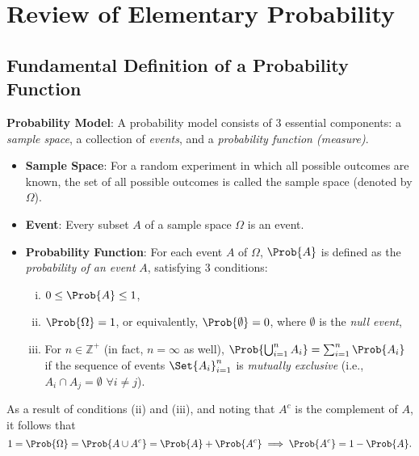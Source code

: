 \chapter{Review of Elementary Probability}
\section*{Fundamental Definition of a Probability Function}
\begin{Regular}
    \textbf{Probability Model}: A probability model consists of 3 essential components: a
    \emph{sample space}, a collection of \emph{events}, and a \emph{probability function (measure)}.
    \begin{itemize}
        \item \textbf{Sample Space}: For a random experiment in which all possible outcomes are known, the
              set of all possible outcomes is called the sample space (denoted by $ \Omega $).
        \item \textbf{Event}: Every subset $ A $ of a sample space $ \Omega $ is an event.
        \item \textbf{Probability Function}: For each event $ A $ of $ \Omega $, $ \Prob{A} $ is defined as the
              \emph{probability of an event} $ A $, satisfying 3 conditions:
              \begin{enumerate}[(i)]
                  \item $ 0\le \Prob{A}\le 1 $,
                  \item $ \Prob{\Omega}=1 $, or equivalently, $ \Prob{\emptyset}=0 $, where $ \emptyset $ is the \emph{null event},
                  \item For $ n\in\mathbb{Z}^+ $ (in fact, $ n=\infty $ as well), $ \Prob{\bigcup_{i=1}^n A_i}=\sum_{i=1}^{n} \Prob{A_i} $ if
                        the sequence of events $ \Set{A_i}_{i=1}^n $ is \emph{mutually exclusive} (i.e., $ A_i\cap A_j=\emptyset $ $ \forall i\ne j $).
              \end{enumerate}
    \end{itemize}
    As a result of conditions (ii) and (iii), and noting that $ A^c $ is the complement of $ A $, it follows
    that
    \[ 1=\Prob{\Omega}=\Prob{A\cup A^c}=\Prob{A}+\Prob{A^c}\implies \Prob{A^c}=1-\Prob{A}. \]
\end{Regular}
